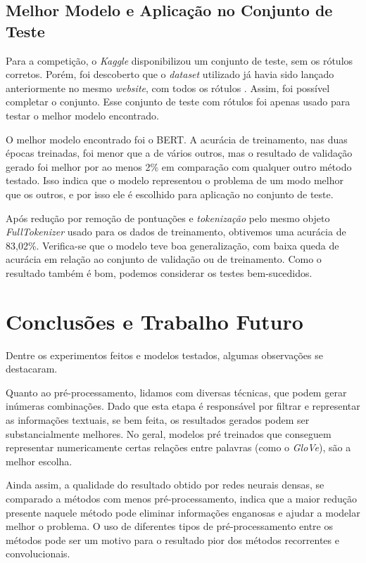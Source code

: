 \documentclass[twoside,conference,a4paper]{IEEEtran}
\begin{document}
\subsection{Melhor Modelo e Aplicação no Conjunto de Teste}
Para a competição, o \textit{Kaggle} disponibilizou um conjunto de teste, sem os rótulos corretos. Porém, foi descoberto que o \textit{dataset} utilizado já havia sido lançado anteriormente no mesmo \textit{website}, com todos os rótulos \cite{test}. Assim, foi possível completar o conjunto. Esse conjunto de teste com rótulos foi apenas usado para testar o melhor modelo encontrado.

O melhor modelo encontrado foi o BERT. A acurácia de treinamento, nas duas épocas treinadas, foi menor que a de vários outros, mas o resultado de validação gerado foi melhor por ao menos 2\% em comparação com qualquer outro método testado. Isso indica que o modelo representou o problema de um modo melhor que os outros, e por isso ele é escolhido para aplicação no conjunto de teste.

Após redução por remoção de pontuações e \textit{tokenização} pelo mesmo objeto \textit{FullTokenizer} usado para os dados de treinamento, obtivemos uma acurácia de 83,02\%. Verifica-se que o modelo teve boa generalização, com baixa queda de acurácia em relação ao conjunto de validação ou de treinamento. Como o resultado também é bom, podemos considerar os testes bem-sucedidos.

\section{Conclusões e Trabalho Futuro} \label{conclusion}

Dentre os experimentos feitos e modelos testados, algumas observações se destacaram. 

Quanto ao pré-processamento, lidamos com diversas técnicas, que podem gerar inúmeras combinações. Dado que esta etapa é responsável por filtrar e representar as informações textuais, se bem feita, os resultados gerados podem ser substancialmente melhores. No geral, modelos pré treinados que conseguem representar numericamente certas relações entre palavras (como o \textit{GloVe}), são a melhor escolha.

Ainda assim, a qualidade do resultado obtido por redes neurais densas, se comparado a métodos com menos pré-processamento, indica que a maior redução presente naquele método pode eliminar informações enganosas e ajudar a modelar melhor o problema. O uso de diferentes tipos de pré-processamento entre os métodos pode ser um motivo para o resultado pior dos métodos recorrentes e convolucionais.
\end{document}

